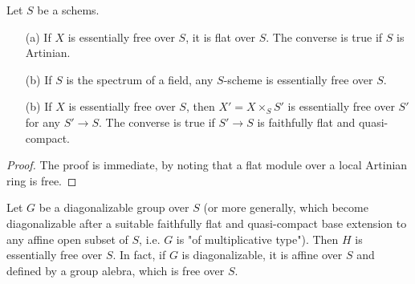 \begin{proposition}\label{scheme morphism essentialy free base change prop}
Let $S$ be a schems.
\begin{enumerate}
    \item[(a)] If $X$ is essentially free over $S$, it is flat over $S$. The converse is true if $S$ is Artinian.
    \item[(b)] If $S$ is the spectrum of a field, any $S$-scheme is essentially free over $S$.
    \item[(b)] If $X$ is essentially free over $S$, then $X'=X\times_SS'$ is essentially free over $S'$ for any $S'\to S$. The converse is true if $S'\to S$ is faithfully flat and quasi-compact.
\end{enumerate}
\end{proposition}
\begin{proof}
The proof is immediate, by noting that a flat module over a local Artinian ring is free.
\end{proof}

\begin{example}\label{scheme group diagonalizable is essentially free}
Let $G$ be a diagonalizable group over $S$ (or more generally, which become diagonalizable after a suitable faithfully flat and quasi-compact base extension to any affine open subset of $S$, i.e. $G$ is "of multiplicative type"). Then $H$ is essentially free over $S$. In fact, if $G$ is diagonalizable, it is affine over $S$ and defined by a group alebra, which is free over $S$.
\end{example}

